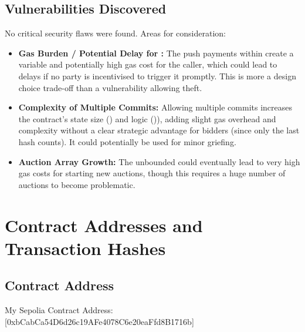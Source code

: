 \documentclass[11pt, a4paper]{article}
\begin{document}
\subsection{Vulnerabilities Discovered}
No critical security flaws were found. Areas for consideration:
\begin{itemize}
    \item \textbf{Gas Burden / Potential Delay for \texttt{}:} The push payments within \texttt{} create a variable and potentially high gas cost for the caller, which could lead to delays if no party is incentivised to trigger it promptly. This is more a design choice trade-off than a vulnerability allowing theft.
    \item \textbf{Complexity of Multiple Commits:} Allowing multiple commits increases the contract's state size (\texttt{}) and logic (\texttt{})), adding slight gas overhead and complexity without a clear strategic advantage for bidders (since only the last hash counts). It could potentially be used for minor griefing.
    \item \textbf{Auction Array Growth:} The unbounded \texttt{} could eventually lead to very high gas costs for starting new auctions, though this requires a huge number of auctions to become problematic.
\end{itemize}

\newpage
\section{Contract Addresses and Transaction Hashes}
\subsection{Contract Address}
My Sepolia Contract Address: [0xbCabCa54D6d26c19AFe4078C6e20eaFfd8B1716b]
\end{document}
